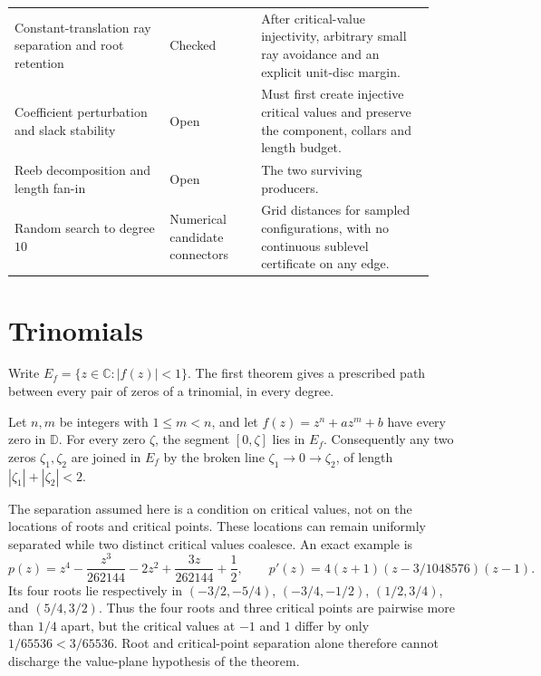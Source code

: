 \documentclass[11pt]{article}
\newcommand{\dbar}{\mathbb{D}}
\begin{document}
\begin{longtable}{@{}
  >{\raggedright\arraybackslash}p{0.34\linewidth}
  >{\raggedright\arraybackslash}p{0.20\linewidth}
  >{\raggedright\arraybackslash}p{0.38\linewidth}@{}}
Constant-translation ray separation and root retention & Checked & After critical-value injectivity, arbitrary small ray avoidance and an explicit unit-disc margin. \\
Coefficient perturbation and slack stability & Open & Must first create injective critical values and preserve the component, collars and length budget. \\
Reeb decomposition and length fan-in & Open & The two surviving producers. \\
Random search to degree $10$ & Numerical candidate connectors & Grid distances for sampled configurations, with no continuous sublevel certificate on any edge. \\
\bottomrule
\end{longtable}
\endgroup

\section{Trinomials}
\label{sec:trinomials}

Write $E_f=\{z\in\mathbb C:|f(z)|<1\}$.  The first theorem gives a prescribed
path between every pair of zeros of a trinomial, in every degree.

\begin{theorem}
\label{res:trinomial-all-degree}
Let $n,m$ be integers with $1\le m<n$, and let $f(z)=z^n+az^m+b$ have every
zero in $\dbar$.  For every zero $\zeta$, the segment $[0,\zeta]$ lies in
$E_f$.  Consequently any two zeros $\zeta_1,\zeta_2$ are joined in $E_f$ by
the broken line $\zeta_1\to0\to\zeta_2$, of length $|\zeta_1|+|\zeta_2|<2$.
\end{theorem}

The separation assumed here is a condition on critical values, not on the
locations of roots and critical points.  These locations can remain uniformly
separated while two distinct critical values coalesce.  An exact example is
\[
 p(z)=z^4-\frac{z^3}{262144}-2z^2+\frac{3z}{262144}+\frac12,
 \qquad
 p'(z)=4(z+1)(z-3/1048576)(z-1).
\]
Its four roots lie respectively in $(-3/2,-5/4)$, $(-3/4,-1/2)$,
$(1/2,3/4)$, and $(5/4,3/2)$.  Thus the four roots and three critical points
are pairwise more than $1/4$ apart, but the critical values at $-1$ and $1$
differ by only $1/65536<3/65536$.  Root and critical-point separation alone
therefore cannot discharge the value-plane hypothesis of the theorem.
\end{document}
